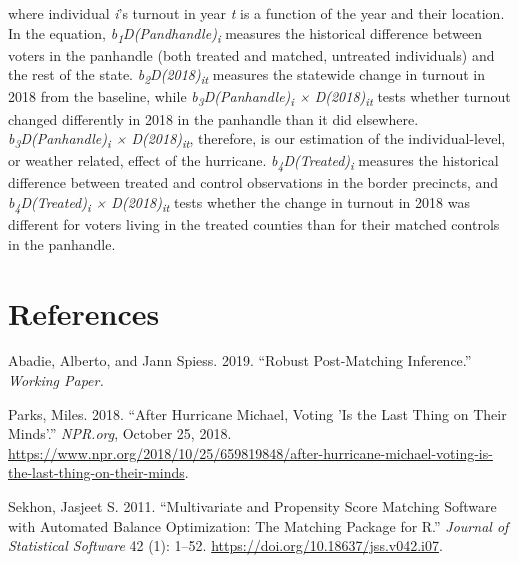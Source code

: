 \documentclass[
  12pt,
]{article}
\newlength{\cslhangindent}
\newenvironment{cslreferences}%
  {\setlength{\parindent}{0pt}%
  \everypar{\setlength{\hangindent}{\cslhangindent}}\ignorespaces}%
  {\par}
\begin{document}
where individual \emph{i}'s turnout in year \emph{t} is a function of the year and their location. In the equation, \emph{b\textsubscript{1}D(Pandhandle)\textsubscript{i}} measures the historical difference between voters in the panhandle (both treated and matched, untreated individuals) and the rest of the state. \emph{b\textsubscript{2}D(2018)\textsubscript{it}} measures the statewide change in turnout in 2018 from the baseline, while \emph{b\textsubscript{3}D(Panhandle)\textsubscript{i} × D(2018)\textsubscript{it}} tests whether turnout changed differently in 2018 in the panhandle than it did elsewhere. \emph{b\textsubscript{3}D(Panhandle)\textsubscript{i} × D(2018)\textsubscript{it}}, therefore, is our estimation of the individual-level, or weather related, effect of the hurricane. \emph{b\textsubscript{4}D(Treated)\textsubscript{i}} measures the historical difference between treated and control observations in the border precincts, and \emph{b\textsubscript{4}D(Treated)\textsubscript{i} × D(2018)\textsubscript{it}} tests whether the change in turnout in 2018 was different for voters living in the treated counties than for their matched controls in the panhandle.

\newpage

\hypertarget{references}{%
\section*{References}\label{references}}

\hypertarget{refs}{}
\begin{cslreferences}
\leavevmode\hypertarget{ref-Abadie2019}{}%
Abadie, Alberto, and Jann Spiess. 2019. ``Robust Post-Matching Inference.'' \emph{Working Paper.}

\leavevmode\hypertarget{ref-Parks2018}{}%
Parks, Miles. 2018. ``After Hurricane Michael, Voting 'Is the Last Thing on Their Minds'.'' \emph{NPR.org}, October 25, 2018. \url{https://www.npr.org/2018/10/25/659819848/after-hurricane-michael-voting-is-the-last-thing-on-their-minds}.

\leavevmode\hypertarget{ref-Sekhon2011}{}%
Sekhon, Jasjeet S. 2011. ``Multivariate and Propensity Score Matching Software with Automated Balance Optimization: The Matching Package for R.'' \emph{Journal of Statistical Software} 42 (1): 1--52. \url{https://doi.org/10.18637/jss.v042.i07}.
\end{cslreferences}
\end{document}
